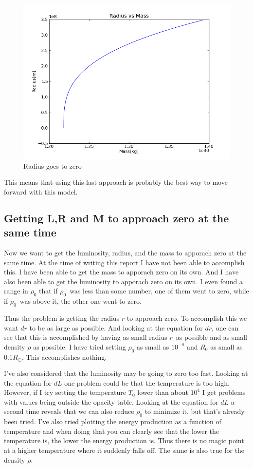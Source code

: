 \documentclass[a4paper,12pt]{article}
\begin{document}
\begin{figure}
\centering
\includegraphics[width=\textwidth]{Radius_to_zero/fixP_rho1e3}
\caption{Radius goes to zero}\label{fig:radius_to_zero}
\end{figure}

This means that using this last approach is probably the best way to move forward with this model.

\subsection{Getting L,R and M to approach zero at the same time}
Now we want to get the luminosity, radius, and the mass to apporach zero at the same time.
At the time of writing this report I have not been able to accomplish this. I have been able to get the mass to apporach zero on its own. And I have also been able to get the luminosity to apporach zero on its own. I even found a range in $\rho_0$ that if $\rho_0$ was less than some number, one of them went to zero, while if $\rho_0$ was above it, the other one went to zero.

Thus the problem is getting the radius $r$ to approach zero. To accomplish this we want $dr$ to be as large as possible. And looking at the equation for $dr$, one can see that this is accomplished by having as small radius $r$ as possible and as small density $\rho$ as possible. I have tried setting  $\rho_0$ as small as $10^{-8}$ and $R_0$ as small as $0.1R_{\odot}$. This accomplishes nothing. 

I've also considered that the luminosity may be going to zero too fast. Looking at the equation for $dL$ one problem could be that the temperature is too high. However, if I try setting the temperature $T_0$ lower than about $10^4$ I get problems with values being outside the opacity table. Looking at the equation for $dL$ a second time reveals that we can also reduce $\rho_0$ to minimize it, but that's already been tried. I've also tried plotting the energy production as a function of temperature and when doing that you can clearly see that the lower the temperature is, the lower the energy production is. Thus there is no magic point at a higher temperature where it suddenly falls off. The same is also true for the density $\rho$.
\end{document}
